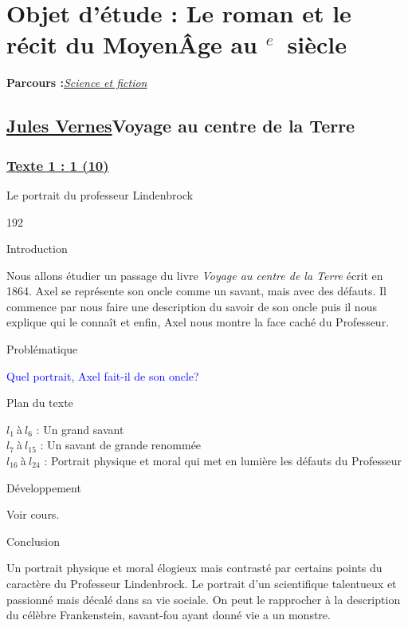 \documentclass[12pt,a4paper]{article}
\begin{document}
		\section[Sciences et fiction]{Objet d'\'etude : Le roman et le r\'ecit du Moyen\^Age au \textsc{}$^{e}$~siècle}
		\textbf{Parcours :}\textit{\underline{Science et fiction}}
			\subsection{\href{.extra/Bio/Jules.pdf}{Jules Vernes}Voyage au centre de la Terre}
				\subsubsection[Texte 1 (10)]{\textbf{\underline{Texte 1 : 1 (10)}}}
			Le portrait du professeur Lindenbrock	
\begin{dingautolist}{192}

\item Introduction \par
Nous allons étudier un passage du livre \textit{Voyage au centre de la Terre} écrit en 1864. Axel se représente son oncle comme un savant, mais avec des défauts.
Il commence par nous faire une description du savoir de son oncle puis il nous explique qui le connaît et enfin, Axel nous montre la face caché du Professeur.
\item Probl\'ematique \par
	\textcolor{blue}{Quel portrait, Axel fait-il de son oncle?}
\item Plan du texte \par	
	$l_{1}~$\`a$~l_{6}$ : Un grand savant\\
    $l_{7}~$\`a$~l_{15}$ : Un savant de grande renommée\\
    $l_{16}~$\`a$~l_{24}$ : Portrait physique et moral qui met en lumière les défauts du Professeur
\item D\'eveloppement \par
        Voir cours.

\item Conclusion \par
Un portrait physique et moral élogieux mais contrasté par certains points du caractère du Professeur Lindenbrock. Le portrait d'un scientifique talentueux et passionné mais décalé dans sa vie sociale.
On peut le rapprocher à la description du célèbre Frankenstein, savant-fou ayant donné vie a un monstre.


\end{dingautolist}
\newpage
\end{document}
